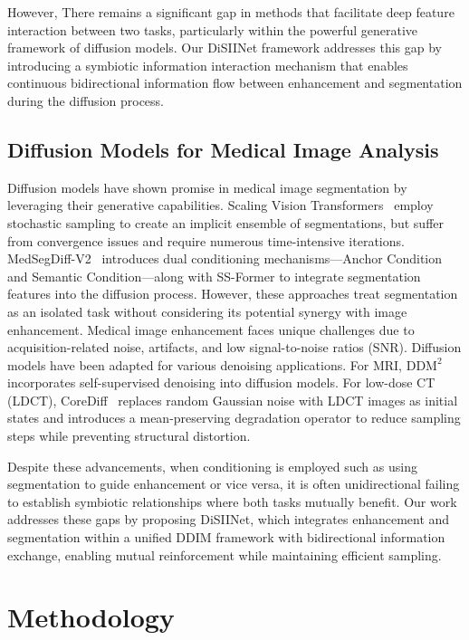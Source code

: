\documentclass{article}
\begin{document}
However, There remains a significant gap in methods that facilitate deep feature interaction between two tasks, particularly within the powerful generative framework of diffusion models. Our DiSIINet framework addresses this gap by introducing a symbiotic information interaction mechanism that enables continuous bidirectional information flow between enhancement and segmentation during the diffusion process.


\subsection{Diffusion Models for Medical Image Analysis}

Diffusion models have shown promise in medical image segmentation by leveraging their generative capabilities. Scaling Vision Transformers~\cite{zhai2022scaling} employ stochastic sampling to create an implicit ensemble of segmentations, but suffer from convergence issues and require numerous time-intensive iterations. MedSegDiff-V2~\cite{wu2024medsegdiff} introduces dual conditioning mechanisms—Anchor Condition and Semantic Condition—along with SS-Former to integrate segmentation features into the diffusion process. However, these approaches treat segmentation as an isolated task without considering its potential synergy with image enhancement. Medical image enhancement faces unique challenges due to acquisition-related noise, artifacts, and low signal-to-noise ratios (SNR). Diffusion models have been adapted for various denoising applications. For MRI, $\mathrm{DDM}^2$~\cite{xiang2023ddm} incorporates self-supervised denoising into diffusion models. For low-dose CT (LDCT), CoreDiff~\cite{gao2023corediff} replaces random Gaussian noise with LDCT images as initial states and introduces a mean-preserving degradation operator to reduce sampling steps while preventing structural distortion. 

Despite these advancements, when conditioning is employed such as using segmentation to guide enhancement or vice versa, it is often unidirectional failing to establish symbiotic relationships where both tasks mutually benefit. Our work addresses these gaps by proposing DiSIINet, which integrates enhancement and segmentation within a unified DDIM framework with bidirectional information exchange, enabling mutual reinforcement while maintaining efficient sampling. 


\section{Methodology}
\end{document}
